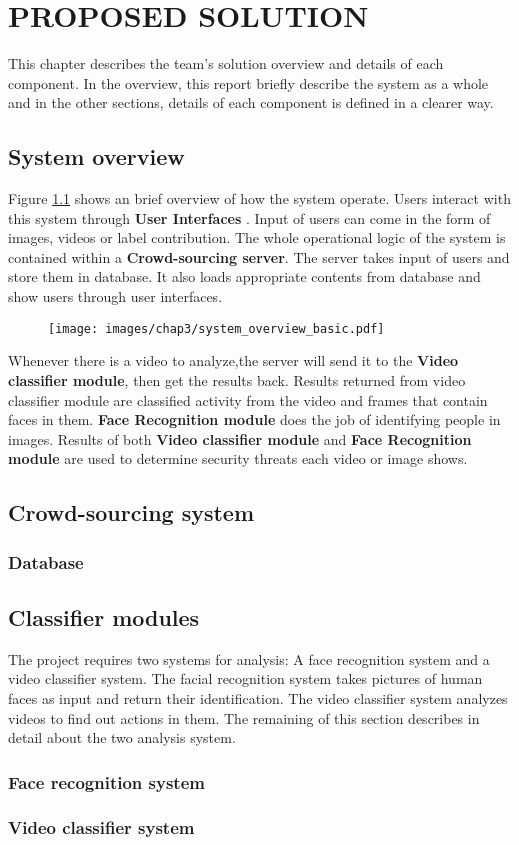 \chapter{PROPOSED SOLUTION}
\label{chap:solution}

This chapter describes the team's solution overview and details of each component. In the overview, this report briefly describe the system as a whole and in the other sections, details of each component is defined in a clearer way.
\section{System overview}
Figure \ref{chap3:system_overview_basic} shows an brief overview of how the system operate. Users interact with this system through \textbf{User Interfaces}
. Input of users can come in the form of images, videos or label contribution. The whole operational logic of the  system is contained within a \textbf{Crowd-sourcing server}. The server takes input of users and store them in database. It also loads appropriate contents from database and show users through user interfaces. 
\begin{center}
    \begin{figure}[H]
    \centering
    \texttt{[image: images/chap3/system\_overview\_basic.pdf]}
    \label{chap3:system_overview_basic}
    \end{figure}
\end{center}
Whenever there is a video to analyze,the server will send it to the \textbf{Video classifier module}, then get the results back. Results returned from video classifier module are classified activity from the video and frames that contain faces in them. \textbf{Face Recognition module} does the job of identifying people in images. Results of both \textbf{Video classifier module} and \textbf{Face Recognition module} are used to determine security threats each video or image shows.

\section{Crowd-sourcing system}
\subsection{Database}
\section{Classifier modules}
The project requires two systems for analysis: A face recognition system and a video classifier system. The facial recognition system takes pictures of human faces as input and return their identification. The video classifier system analyzes videos to find out actions in them. The remaining of this section describes in detail about the two analysis system.
\subsection{Face recognition system}

\subsection{Video classifier system}

